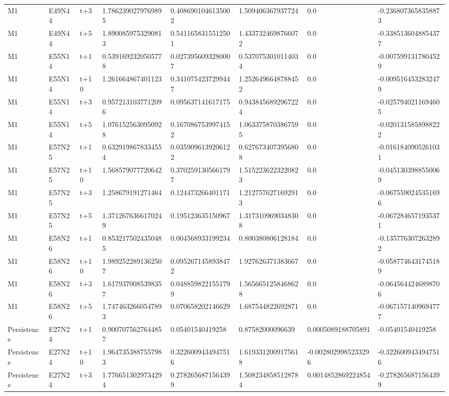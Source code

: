 \begin{landscape}
\begin{longtable}{llllllll}
M1 & E49N44 & t+3 & 1.7862390279769895 & 0.4086901046135002 & 1.509406367937724 & 0.0 & -0.2368073658358873 \\
M1 & E49N44 & t+5 & 1.8900859753290813 & 0.5411658315512501 & 1.4337324698766072 & 0.0 & -0.3385136048854377 \\
M1 & E55N14 & t+1 & 0.5391692320505778 & 0.0273956093280007 & 0.5370753010114034 & 0.0 & -0.0075991317804529 \\
M1 & E55N14 & t+10 & 1.261664867401123 & 0.3410754237299447 & 1.2526496648788452 & 0.0 & -0.0095164532832479 \\
M1 & E55N14 & t+3 & 0.9572131037712096 & 0.095637141617175 & 0.9438456892967224 & 0.0 & -0.0257940211694605 \\
M1 & E55N14 & t+5 & 1.0761525630950928 & 0.1670867539974152 & 1.0633758703867595 & 0.0 & -0.0201315858988222 \\
M1 & E57N25 & t+1 & 0.6329198678334554 & 0.0359096139206122 & 0.6276734073956808 & 0.0 & -0.0161840905261031 \\
M1 & E57N25 & t+10 & 1.568579077720642 & 0.3702591305661797 & 1.5152236223220823 & 0.0 & -0.0451303988550069 \\
M1 & E57N25 & t+3 & 1.258679191271464 & 0.124473266401171 & 1.2127576271692913 & 0.0 & -0.0675590245351696 \\
M1 & E57N25 & t+5 & 1.3712676366170249 & 0.195123635150967 & 1.3173109690348308 & 0.0 & -0.0672846571935371 \\
M1 & E58N26 & t+1 & 0.8532175024350485 & 0.004568933199234 & 0.800380806128184 & 0.0 & -0.1357763072632892 \\
M1 & E58N26 & t+10 & 1.9892522891362507 & 0.0952671458938472 & 1.927626371383667 & 0.0 & -0.0587746431745189 \\
M1 & E58N26 & t+3 & 1.6179370085398357 & 0.0488598221551799 & 1.5656651258468628 & 0.0 & -0.0645644246898706 \\
M1 & E58N26 & t+5 & 1.7474632660547893 & 0.070658202146629 & 1.687544822692871 & 0.0 & -0.0671571409694777 \\
Persistence & E27N24 & t+1 & 0.9007075627644857 & 0.05401540419258 & 0.87582000096639 & 0.0005089188705891 & -0.05401540419258 \\
Persistence & E27N24 & t+10 & 1.9647353887557983 & 0.3226009434947516 & 1.6193312009175618 & -0.0028029985233296 & -0.3226009434947516 \\
Persistence & E27N24 & t+3 & 1.7766513029734294 & 0.2782656871564399 & 1.5082348585128784 & 0.0014852869224854 & -0.2782656871564399 \\

\end{longtable}
\end{landscape}
